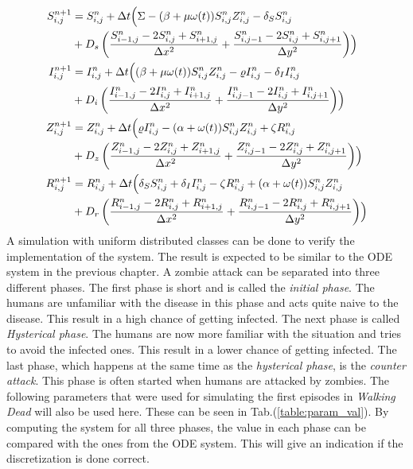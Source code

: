 \documentclass[%
twoside,                 %
final,                   %
10pt]{article}
\begin{document}
\begin{equation} \label{eq:SIZR_disc2}
	\begin{aligned}
    S^{n+1}_{i,j} &= S^n_{i,j} + \Delta t \Bigl( \Sigma - (\beta+\mu \omega(t))S^{n}_{i,j}Z^{n}_{i,j}- \delta_S S^{n}_{i,j} \\
        &+ D_s\left(\frac{S^{n}_{i-1,j}-2S^{n}_{i,j}+S^{n}_{i+1,j}}{\Delta x^2}+\frac{S^{n}_{i,j-1}-2S^{n}_{i,j}+S^{n}_{i,j+1}}{\Delta y^2}\right)\Bigr) \\
    I^{n+1}_{i,j} &= I^n_{i,j} + \Delta t \Bigl((\beta+\mu \omega(t))S^{n}_{i,j}Z^{n}_{i,j}-\varrho I^{n}_{i,j}- \delta_I I^{n}_{i,j} \\
        &+ D_i\left(\frac{I^{n}_{i-1,j}-2I^{n}_{i,j}+I^{n}_{i+1,j}}{\Delta x^2}+\frac{I^{n}_{i,j-1}-2I^{n}_{i,j}+I^{n}_{i,j+1}}{\Delta y^2}\right)\Bigr) \\ 
    Z^{n+1}_{i,j} &= Z^n_{i,j} +\Delta t \Bigl( \varrho I^{n}_{i,j}-(\alpha+\omega(t))S^{n}_{i,j}Z^{n}_{i,j}+ \zeta R^{n}_{i,j} \\
        &+D_z\left(\frac{Z^{n}_{i-1,j}-2Z^{n}_{i,j}+Z^{n}_{i+1,j}}{\Delta x^2}+\frac{Z^{n}_{i,j-1}-2Z^{n}_{i,j}+Z^{n}_{i,j+1}}{\Delta y^2}\right)\Bigr) \\
    R^{n+1}_{i,j} &= R^n_{i,j} +\Delta t \Bigl(\delta_S S^{n}_{i,j}+\delta_I I^{n}_{i,j}-\zeta R^{n}_{i,j}+(\alpha+\omega(t))S^{n}_{i,j}Z^{n}_{i,j} \\
        &+D_r\left(\frac{R^{n}_{i-1,j}-2R^{n}_{i,j}+R^{n}_{i+1,j}}{\Delta x^2}+\frac{R^{n}_{i,j-1}-2R^{n}_{i,j}+R^{n}_{i,j+1}}{\Delta y^2}\right)\Bigr) 
	\end{aligned}
\end{equation}
A simulation with uniform distributed classes can be done to verify the implementation of the system. The result is expected to be similar to the ODE system in the previous chapter. A zombie attack can be separated into three different phases. The first phase is short and is called the \emph{initial phase}. The humans are unfamiliar with the disease in this phase and acts quite naive to the disease. This result in a high chance of getting infected. The next phase is called \emph{Hysterical phase}. The humans are now more familiar with the situation and tries to avoid the infected ones. This result in a lower chance of getting infected. The last phase, which happens at the same time as the \emph{hysterical phase}, is the \emph{counter attack}. This phase is often started when humans are attacked by zombies. The following parameters that were used for simulating the first episodes in \emph{Walking Dead} will also be used here. These can be seen in Tab.(\ref{table:param_val}). By computing the system for all three phases, the value in each phase can be compared with the ones from the ODE system. This will give an indication if the discretization is done correct. 
\end{document}
